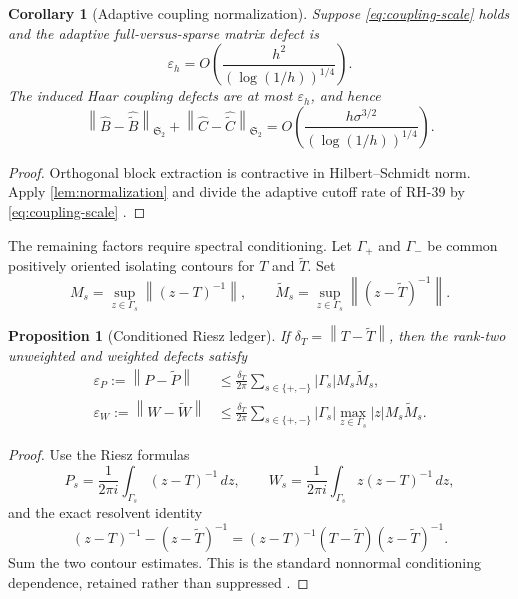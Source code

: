 \documentclass[11pt]{article}
\newtheorem{proposition}[theorem]{Proposition}
\newtheorem{corollary}[theorem]{Corollary}
\theoremstyle{definition}
\theoremstyle{remark}
\newcommand{\HS}{\mathfrak S_2}
\newcommand{\norm}[1]{\left\lVert #1\right\rVert}
\begin{document}
\begin{corollary}[Adaptive coupling normalization]
\label{cor:adaptive-normalization}
Suppose \eqref{eq:coupling-scale} holds and the adaptive full-versus-sparse
matrix defect is
\[
 \varepsilon_h
 =O\!\left(\frac{h^2}{(\log(1/h))^{1/4}}\right).
\]
The induced Haar coupling defects are at most $\varepsilon_h$, and hence
\begin{equation}
 \norm{\widehat B-\widehat{\widetilde B}}_{\HS}
 +\norm{\widehat C-\widehat{\widetilde C}}_{\HS}
 =O\!\left(
 \frac{h\sigma^{3/2}}{(\log(1/h))^{1/4}}
 \right).
 \label{eq:adaptive-normalization}
\end{equation}
\end{corollary}

\begin{proof}
Orthogonal block extraction is contractive in Hilbert--Schmidt norm.  Apply
\cref{lem:normalization} and divide the adaptive cutoff rate of RH-39 by
\eqref{eq:coupling-scale} \citep{WangCutoff2026}.
\end{proof}

The remaining factors require spectral conditioning.  Let
$\Gamma_+$ and $\Gamma_-$ be common positively oriented isolating contours
for $T$ and $\widetilde T$.  Set
\[
 M_s=\sup_{z\in\Gamma_s}\norm{(z-T)^{-1}},
 \qquad
 \widetilde M_s
 =\sup_{z\in\Gamma_s}\norm{(z-\widetilde T)^{-1}}.
\]

\begin{proposition}[Conditioned Riesz ledger]
\label{prop:riesz-ledger}
If $\delta_T=\norm{T-\widetilde T}$, then the rank-two unweighted and
weighted defects satisfy
\begin{align}
 \varepsilon_P
 :=\norm{P-\widetilde P}
 &\le
 \frac{\delta_T}{2\pi}
 \sum_{s\in\{+,-\}}
 |\Gamma_s|M_s\widetilde M_s,
 \label{eq:projector-ledger}\\
 \varepsilon_W
 :=\norm{W-\widetilde W}
 &\le
 \frac{\delta_T}{2\pi}
 \sum_{s\in\{+,-\}}
 |\Gamma_s|\max_{z\in\Gamma_s}|z|M_s\widetilde M_s.
 \label{eq:weighted-ledger}
\end{align}
\end{proposition}

\begin{proof}
Use the Riesz formulas
\[
 P_s=\frac1{2\pi i}\int_{\Gamma_s}(z-T)^{-1}\,dz,
 \qquad
 W_s=\frac1{2\pi i}\int_{\Gamma_s}z(z-T)^{-1}\,dz,
\]
and the exact resolvent identity
\[
 (z-T)^{-1}-(z-\widetilde T)^{-1}
 =(z-T)^{-1}(T-\widetilde T)(z-\widetilde T)^{-1}.
\]
Sum the two contour estimates.  This is the standard nonnormal
conditioning dependence, retained rather than suppressed
\citep{Kato1995,HornJohnson2013}.
\end{proof}
\end{document}
